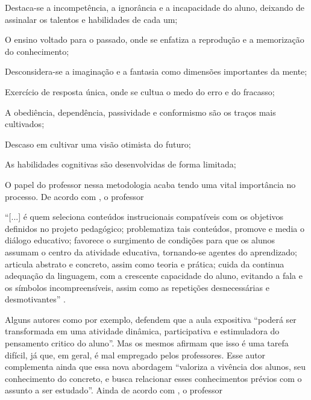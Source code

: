 \begin{alineascomponto}

\item Destaca-se a incompetência, a ignorância e a incapacidade do aluno, deixando de assinalar os talentos e habilidades de cada um; 
\item O ensino voltado para o passado, onde se enfatiza a reprodução e a memorização do conhecimento;
\item Desconsidera-se a imaginação e a fantasia como dimensões importantes da mente;
\item Exercício de resposta única, onde se cultua o medo do erro e do fracasso;
\item A obediência, dependência, passividade e conformismo são os traços mais cultivados;
\item Descaso em cultivar uma visão otimista do futuro;
\item As habilidades cognitivas são desenvolvidas de forma limitada;

\end{alineascomponto}

O papel do professor nessa metodologia acaba tendo uma vital importância no processo. De acordo com , o professor         

\begin{citacao}
``[...] é quem seleciona conteúdos instrucionais compatíveis com os objetivos definidos no projeto pedagógico; problematiza tais conteúdos, promove e media o diálogo educativo; favorece o surgimento de condições para que os alunos assumam o centro da atividade educativa, tornando-se agentes do aprendizado; articula abstrato e concreto, assim como teoria e prática; cuida da continua adequação da linguagem, com a crescente capacidade do aluno, evitando a fala e os símbolos incompreensíveis, assim como as repetições desnecessárias e desmotivantes'' \cite{brasil1999parametros}.
\end{citacao}

Alguns autores como  por exemplo, defendem que a aula expositiva ``poderá ser transformada em uma atividade dinâmica, participativa e estimuladora do pensamento critico do aluno''. Mas os mesmos afirmam que isso é uma tarefa difícil, já que, em geral, é mal empregado pelos professores. Esse autor complementa ainda que essa nova abordagem ``valoriza a vivência dos alunos, seu conhecimento do concreto, e busca relacionar esses conhecimentos prévios com o assunto a ser estudado''. Ainda de acordo com , o professor

